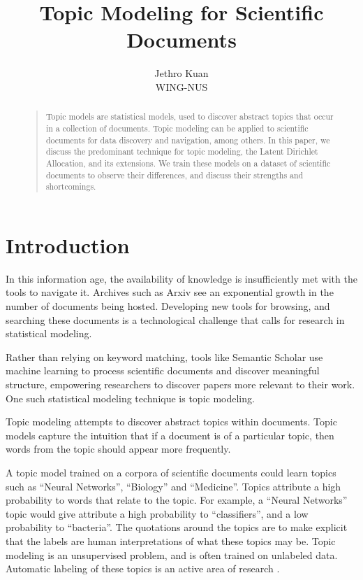 \documentclass[letterpaper]{article}
\begin{document}
\nocopyright

\title{Topic Modeling for Scientific Documents}
\author{Jethro Kuan \\
  WING-NUS\\
}
\maketitle
\begin{abstract}
  \begin{quote}
    Topic models are statistical models, used to discover abstract
    topics that occur in a collection of documents. Topic modeling can
    be applied to scientific documents for data discovery and
    navigation, among others. In this paper, we discuss the
    predominant technique for topic modeling, the Latent Dirichlet
    Allocation, and its extensions. We train these models on a dataset
    of scientific documents to observe their differences, and discuss
    their strengths and shortcomings.
  \end{quote}
\end{abstract}

\section{Introduction}
In this information age, the availability of knowledge is
insufficiently met with the tools to navigate it. Archives such as
Arxiv see an exponential growth in the number of documents being
hosted. Developing new tools for browsing, and searching these
documents is a technological challenge that calls for research in
statistical modeling.

Rather than relying on keyword matching, tools like Semantic Scholar
use machine learning to process scientific documents and discover
meaningful structure, empowering researchers to discover papers more
relevant to their work. One such statistical modeling technique is
topic modeling.

Topic modeling attempts to discover abstract topics within documents.
Topic models capture the intuition that if a document is of a
particular topic, then words from the topic should appear more
frequently.

A topic model trained on a corpora of scientific documents could learn
topics such as ``Neural Networks'', ``Biology'' and ``Medicine''.
Topics attribute a high probability to words that relate to the topic.
For example, a ``Neural Networks'' topic would give attribute a high
probability to ``classifiers'', and a low probability to ``bacteria''.
The quotations around the topics are to make explicit that the labels
are human interpretations of what these topics may be. Topic modeling
is an unsupervised problem, and is often trained on unlabeled data.
Automatic labeling of these topics is an active area of research
\cite{mei2007automatic, lau2011automatic}.
\end{document}
